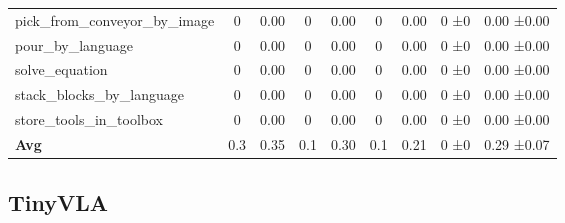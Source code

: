 \begin{table}[H]
{\begin{tabular}{l|c|c|c|c|c|c|c|c}
pick\_from\_conveyor\_by\_image & 0 & 0.00 & 0 & 0.00 & 0 & 0.00 & 0 ±0 & 0.00 ±0.00 \\
pour\_by\_language & 0 & 0.00 & 0 & 0.00 & 0 & 0.00 & 0 ±0 & 0.00 ±0.00 \\
solve\_equation & 0 & 0.00 & 0 & 0.00 & 0 & 0.00 & 0 ±0 & 0.00 ±0.00 \\
stack\_blocks\_by\_language & 0 & 0.00 & 0 & 0.00 & 0 & 0.00 & 0 ±0 & 0.00 ±0.00 \\
store\_tools\_in\_toolbox & 0 & 0.00 & 0 & 0.00 & 0 & 0.00 & 0 ±0 & 0.00 ±0.00 \\
\hline
\textbf{Avg} & 0.3 & 0.35 & 0.1 & 0.30 & 0.1 & 0.21 & 0 ±0 & 0.29 ±0.07 \\
\hline
\end{tabular}
}
\end{table}
\subsection{TinyVLA}
\label{part:tinyvla}

